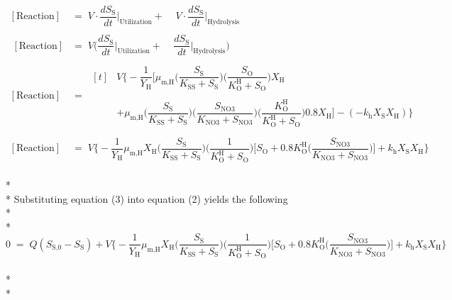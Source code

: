 \documentclass[]{article}
\begin{document}
\begin{align}
\nonumber
[\text{Reaction}] \; &= \; V \cdot  \dfrac{dS_{\text{S}}}{dt}\biggr\rvert_{\text{Utilization}} + \; \;  \; \; V \cdot \dfrac{dS_{\text{S}}}{dt}\biggr\rvert_{\text{Hydrolysis}} \\ \\ \nonumber \; [\text{Reaction}] &= \;  V\Bigg(\dfrac{dS_{\text{S}}}{dt}\biggr\rvert_{\text{Utilization}} + \; \;  \; \; \dfrac{dS_{\text{S}}}{dt}\biggr\rvert_{\text{Hydrolysis}}\Bigg) \\ \nonumber \\ \nonumber
[\text{Reaction}] \; &= \; 
\begin{aligned}[t]
&V \Bigg\{-\dfrac{1}{Y_{\text{H}}}\Bigg[\mu_{\text{m,H}} \Bigg(\dfrac{S_{\text{S}}}{K_{\text{SS}}+S_{\text{S}}}\Bigg)\Bigg(\dfrac{S_{\text{O}}}{K^{\text{H}}_{\text{O}}+S_{\text{O}}}\Bigg)X_{\text{H}} \\ \\
&+ \mu_{\text{m,H}}\Bigg(\dfrac{S_{\text{S}}}{K_{\text{SS}}+S_{\text{S}}}\Bigg)\Bigg(\dfrac{S_{\text{NO3}}}{K_{\text{NO3}}+S_{\text{NO3}}}\Bigg)\Bigg(\dfrac{K^{\text{H}}_{\text{O}}}{K^{\text{H}}_{\text{O}}+S_{\text{O}}}\Bigg)0.8X_{\text{H}}\Bigg] - (-k_{\text{h}}X_{\text{S}}X_{\text{H}})\Bigg\} 
\end{aligned} \\ \nonumber \\ \nonumber
[\text{Reaction}] \; &= \; V \Bigg\{-\dfrac{1}{Y_{\text{H}}}\mu_{\text{m,H}}X_{\text{H}}\Bigg(\dfrac{S_{\text{S}}}{K_{\text{SS}}+S_{\text{S}}}\Bigg)\Bigg(\dfrac{1}{K^{\text{H}}_{\text{O}}+S_{\text{O}}}\Bigg)\Bigg[S_{\text{O}} + 0.8K^{\text{H}}_{\text{O}}\Bigg(\dfrac{S_{\text{NO3}}}{K_{\text{NO3}}+S_{\text{NO3}}}\Bigg)\Bigg] + k_{\text{h}}X_{\text{S}}X_{\text{H}}\Bigg\}
\end{align} \\* \\* 
Substituting equation (3) into equation (2) yields the following \\* \\* 
\begin{equation}
\nonumber
0 \; = \; Q(S_{\text{S,0}} - S_{\text{S}}) + V \Bigg\{-\dfrac{1}{Y_{\text{H}}}\mu_{\text{m,H}}X_{\text{H}}\Bigg(\dfrac{S_{\text{S}}}{K_{\text{SS}}+S_{\text{S}}}\Bigg)\Bigg(\dfrac{1}{K^{\text{H}}_{\text{O}}+S_{\text{O}}}\Bigg)\Bigg[S_{\text{O}} + 0.8K^{\text{H}}_{\text{O}}\Bigg(\dfrac{S_{\text{NO3}}}{K_{\text{NO3}}+S_{\text{NO3}}}\Bigg)\Bigg] + k_{\text{h}}X_{\text{S}}X_{\text{H}}\Bigg\}
\end{equation}  \\* \\* 
\end{document}
